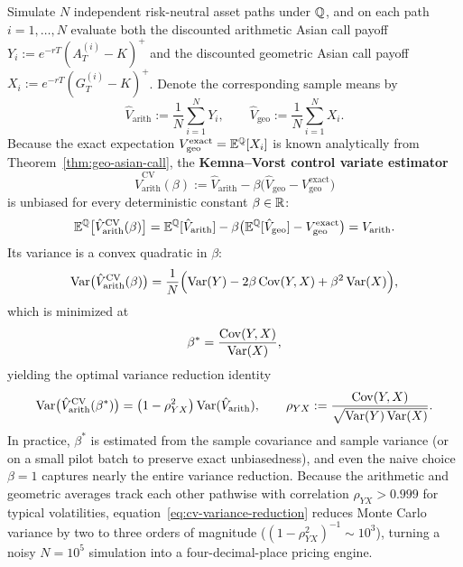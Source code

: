 Simulate $N$ independent risk-neutral asset paths under $\mathbb{Q}$, and on each path $i = 1, \ldots, N$ evaluate both the discounted arithmetic Asian call payoff $Y_i := e^{-rT}(A_T^{(i)} - K)^+$ and the discounted geometric Asian call payoff $X_i := e^{-rT}(G_T^{(i)} - K)^+$. Denote the corresponding sample means by
\[
\hat{V}_{\mathrm{arith}} := \frac{1}{N}\sum_{i=1}^N Y_i, \qquad \hat{V}_{\mathrm{geo}} := \frac{1}{N}\sum_{i=1}^N X_i.
\]
Because the exact expectation $V_{\mathrm{geo}}^{\mathrm{exact}} = \mathbb{E}^{\mathbb{Q}}[X_i]$ is known analytically from Theorem~\ref{thm:geo-asian-call}, the \textbf{Kemna--Vorst control variate estimator}
\begin{equation}\label{eq:kemna-vorst-cv}
    \hat{V}_{\mathrm{arith}}^{\mathrm{CV}}(\beta) := \hat{V}_{\mathrm{arith}} - \beta\bigl(\hat{V}_{\mathrm{geo}} - V_{\mathrm{geo}}^{\mathrm{exact}}\bigr)
\end{equation}
is unbiased for every deterministic constant $\beta \in \mathbb{R}$:
\[
\mathbb{E}^{\mathbb{Q}}\bigl[\hat{V}_{\mathrm{arith}}^{\mathrm{CV}}(\beta)\bigr] = \mathbb{E}^{\mathbb{Q}}[\hat{V}_{\mathrm{arith}}] - \beta\bigl(\mathbb{E}^{\mathbb{Q}}[\hat{V}_{\mathrm{geo}}] - V_{\mathrm{geo}}^{\mathrm{exact}}\bigr) = V_{\mathrm{arith}}.
\]
Its variance is a convex quadratic in $\beta$:
\[
\operatorname{Var}\bigl(\hat{V}_{\mathrm{arith}}^{\mathrm{CV}}(\beta)\bigr) = \frac{1}{N}\Bigl(\operatorname{Var}(Y) - 2\beta\operatorname{Cov}(Y, X) + \beta^2\operatorname{Var}(X)\Bigr),
\]
which is minimized at
\[
\beta^* = \frac{\operatorname{Cov}(Y, X)}{\operatorname{Var}(X)},
\]
yielding the optimal variance reduction identity
\begin{equation}\label{eq:cv-variance-reduction}
    \operatorname{Var}\bigl(\hat{V}_{\mathrm{arith}}^{\mathrm{CV}}(\beta^*)\bigr) = \bigl(1 - \rho_{YX}^2\bigr)\operatorname{Var}(\hat{V}_{\mathrm{arith}}), \qquad \rho_{YX} := \frac{\operatorname{Cov}(Y, X)}{\sqrt{\operatorname{Var}(Y)\operatorname{Var}(X)}}.
\end{equation}
In practice, $\beta^*$ is estimated from the sample covariance and sample variance (or on a small pilot batch to preserve exact unbiasedness), and even the naive choice $\beta = 1$ captures nearly the entire variance reduction. Because the arithmetic and geometric averages track each other pathwise with correlation $\rho_{YX} > 0.999$ for typical volatilities, equation~\eqref{eq:cv-variance-reduction} reduces Monte Carlo variance by two to three orders of magnitude ($(1 - \rho_{YX}^2)^{-1} \sim 10^3$), turning a noisy $N = 10^5$ simulation into a four-decimal-place pricing engine.

